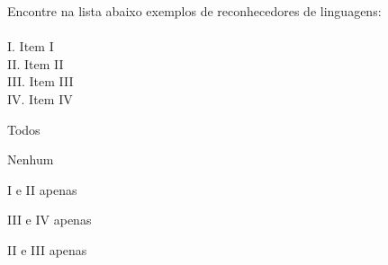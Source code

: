 \question[10]
Encontre na lista abaixo exemplos de reconhecedores de linguagens:\\
\\
I. Item I\\
II. Item II\\
III. Item III\\
IV. Item IV
\\
\begin{choices}
\item Todos
\item Nenhum %
\item I e II apenas
\item III e IV apenas
\item II e III apenas
\end{choices}
\answerline

